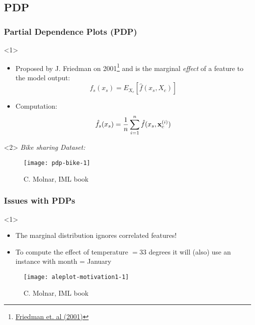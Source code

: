 \subsection{PDP}
\begin{frame}
 \frametitle{Partial Dependence Plots (PDP)}
 \begin{onlyenv}<1>
   \begin{itemize}
   \item Proposed by J. Friedman on 2001\footnote{\href{https://projecteuclid.org/journals/annals-of-statistics/volume-29/issue-5/Greedy-function-approximation-A-gradient-boostingmachine/10.1214/aos/1013203451.full}{Friedman et. al (2001)}} and is the marginal \emph{effect} of a feature to the
     model output:
     \begin{equation*}
       f_s(x_s) = E_{X_c}\left[\hat{f}(x_s, X_c)\right]
     \end{equation*}
   \item Computation:
     \begin{equation*}
       \hat{f}_s(x_s) = \frac{1}{n}\sum\limits_{i=1}^{n}\hat{f}(x_s, \mathbf{x}_c^{(i)})
     \end{equation*}
   \end{itemize}
 \end{onlyenv}
 \begin{onlyenv}<2>
   \emph{Bike sharing Dataset:}
   \begin{figure}
     \texttt{[image: pdp-bike-1]}
     \caption{\footnotesize C. Molnar, IML book}
   \end{figure}
 \end{onlyenv}
\end{frame}

\begin{frame}
 \frametitle{Issues with PDPs}
 \begin{onlyenv}<1>
   \begin{itemize}
   \item The marginal distribution ignores correlated features!
   \item To compute the effect of temperature $=33$ degrees it will (also) use an instance
       with month = January
   \end{itemize}
   \begin{figure}
     \texttt{[image: aleplot-motivation1-1]}
     \caption{\footnotesize C. Molnar, IML book}
   \end{figure}
 \end{onlyenv}
\end{frame}

